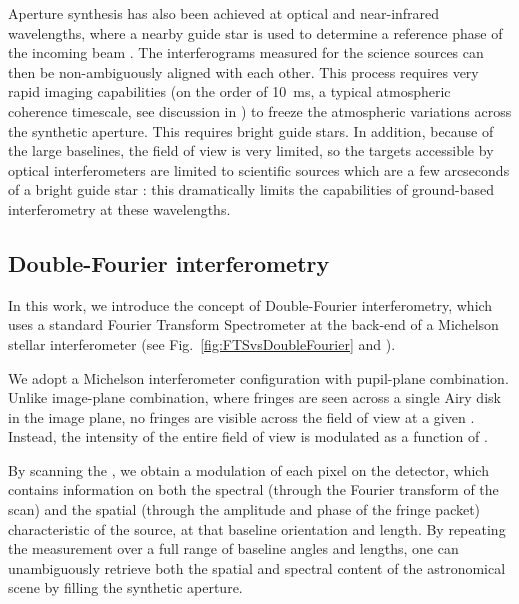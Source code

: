 Aperture synthesis has also been achieved at optical and near-infrared wavelengths, where a nearby guide star is used to determine a reference phase of the incoming beam \citep[e.g.][]{Monnier:2004fd,Gillessen:2010fo}. The interferograms measured for the science sources can then be non-ambiguously aligned with each other. This process requires very rapid imaging capabilities (on the order of \SI{10}{\milli\second}, a typical atmospheric coherence timescale, see discussion in \cite{Mariotti:1988vea}) to freeze the atmospheric variations across the synthetic aperture. This requires bright guide stars. In addition, because of the large baselines, the field of view is very limited, so the targets accessible by optical interferometers are limited to scientific sources which are a few arcseconds of a bright guide star \citep{Glindemann:2000bf}: this dramatically limits the capabilities of ground-based interferometry at these wavelengths.


\subsection{Double-Fourier interferometry}


In this work, we introduce the concept of Double-Fourier interferometry, which uses a standard Fourier Transform Spectrometer at the back-end of a Michelson stellar interferometer (see Fig.~\ref{fig:FTSvsDoubleFourier} and \citet{Mariotti:1988vea}). 


We adopt a Michelson interferometer configuration with pupil-plane combination. Unlike image-plane combination, where fringes are seen across a single Airy disk in the image plane, no fringes are visible across the field of view at a given \OPD. Instead, the intensity of the entire field of view is modulated as a function of \OPD. 

By scanning the \OPD, we obtain a modulation of each pixel on the detector, which contains information on both the spectral (through the Fourier transform of the scan) and the spatial (through the amplitude and phase of the fringe packet) characteristic of the source, at that baseline orientation and length. By repeating the measurement over a full range of baseline angles and lengths, one can unambiguously retrieve both the spatial and spectral content of the astronomical scene by filling the synthetic aperture. 

